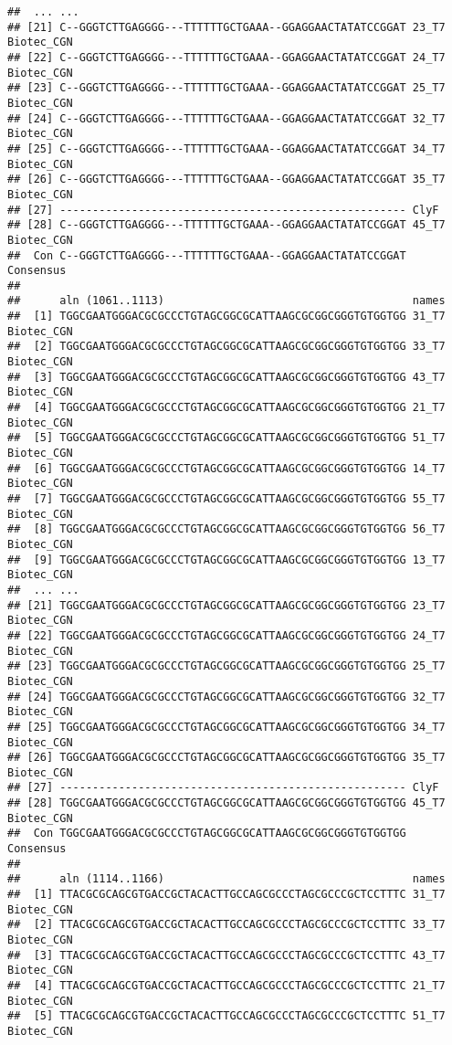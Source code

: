 \documentclass[
]{article}
\begin{document}
\begin{verbatim}
##  ... ...
## [21] C--GGGTCTTGAGGGG---TTTTTTGCTGAAA--GGAGGAACTATATCCGGAT 23_T7 Biotec_CGN
## [22] C--GGGTCTTGAGGGG---TTTTTTGCTGAAA--GGAGGAACTATATCCGGAT 24_T7 Biotec_CGN
## [23] C--GGGTCTTGAGGGG---TTTTTTGCTGAAA--GGAGGAACTATATCCGGAT 25_T7 Biotec_CGN
## [24] C--GGGTCTTGAGGGG---TTTTTTGCTGAAA--GGAGGAACTATATCCGGAT 32_T7 Biotec_CGN
## [25] C--GGGTCTTGAGGGG---TTTTTTGCTGAAA--GGAGGAACTATATCCGGAT 34_T7 Biotec_CGN
## [26] C--GGGTCTTGAGGGG---TTTTTTGCTGAAA--GGAGGAACTATATCCGGAT 35_T7 Biotec_CGN
## [27] ----------------------------------------------------- ClyF
## [28] C--GGGTCTTGAGGGG---TTTTTTGCTGAAA--GGAGGAACTATATCCGGAT 45_T7 Biotec_CGN
##  Con C--GGGTCTTGAGGGG---TTTTTTGCTGAAA--GGAGGAACTATATCCGGAT Consensus 
## 
##      aln (1061..1113)                                      names
##  [1] TGGCGAATGGGACGCGCCCTGTAGCGGCGCATTAAGCGCGGCGGGTGTGGTGG 31_T7 Biotec_CGN
##  [2] TGGCGAATGGGACGCGCCCTGTAGCGGCGCATTAAGCGCGGCGGGTGTGGTGG 33_T7 Biotec_CGN
##  [3] TGGCGAATGGGACGCGCCCTGTAGCGGCGCATTAAGCGCGGCGGGTGTGGTGG 43_T7 Biotec_CGN
##  [4] TGGCGAATGGGACGCGCCCTGTAGCGGCGCATTAAGCGCGGCGGGTGTGGTGG 21_T7 Biotec_CGN
##  [5] TGGCGAATGGGACGCGCCCTGTAGCGGCGCATTAAGCGCGGCGGGTGTGGTGG 51_T7 Biotec_CGN
##  [6] TGGCGAATGGGACGCGCCCTGTAGCGGCGCATTAAGCGCGGCGGGTGTGGTGG 14_T7 Biotec_CGN
##  [7] TGGCGAATGGGACGCGCCCTGTAGCGGCGCATTAAGCGCGGCGGGTGTGGTGG 55_T7 Biotec_CGN
##  [8] TGGCGAATGGGACGCGCCCTGTAGCGGCGCATTAAGCGCGGCGGGTGTGGTGG 56_T7 Biotec_CGN
##  [9] TGGCGAATGGGACGCGCCCTGTAGCGGCGCATTAAGCGCGGCGGGTGTGGTGG 13_T7 Biotec_CGN 
##  ... ...
## [21] TGGCGAATGGGACGCGCCCTGTAGCGGCGCATTAAGCGCGGCGGGTGTGGTGG 23_T7 Biotec_CGN
## [22] TGGCGAATGGGACGCGCCCTGTAGCGGCGCATTAAGCGCGGCGGGTGTGGTGG 24_T7 Biotec_CGN
## [23] TGGCGAATGGGACGCGCCCTGTAGCGGCGCATTAAGCGCGGCGGGTGTGGTGG 25_T7 Biotec_CGN
## [24] TGGCGAATGGGACGCGCCCTGTAGCGGCGCATTAAGCGCGGCGGGTGTGGTGG 32_T7 Biotec_CGN
## [25] TGGCGAATGGGACGCGCCCTGTAGCGGCGCATTAAGCGCGGCGGGTGTGGTGG 34_T7 Biotec_CGN
## [26] TGGCGAATGGGACGCGCCCTGTAGCGGCGCATTAAGCGCGGCGGGTGTGGTGG 35_T7 Biotec_CGN
## [27] ----------------------------------------------------- ClyF
## [28] TGGCGAATGGGACGCGCCCTGTAGCGGCGCATTAAGCGCGGCGGGTGTGGTGG 45_T7 Biotec_CGN
##  Con TGGCGAATGGGACGCGCCCTGTAGCGGCGCATTAAGCGCGGCGGGTGTGGTGG Consensus 
## 
##      aln (1114..1166)                                      names
##  [1] TTACGCGCAGCGTGACCGCTACACTTGCCAGCGCCCTAGCGCCCGCTCCTTTC 31_T7 Biotec_CGN
##  [2] TTACGCGCAGCGTGACCGCTACACTTGCCAGCGCCCTAGCGCCCGCTCCTTTC 33_T7 Biotec_CGN
##  [3] TTACGCGCAGCGTGACCGCTACACTTGCCAGCGCCCTAGCGCCCGCTCCTTTC 43_T7 Biotec_CGN
##  [4] TTACGCGCAGCGTGACCGCTACACTTGCCAGCGCCCTAGCGCCCGCTCCTTTC 21_T7 Biotec_CGN
##  [5] TTACGCGCAGCGTGACCGCTACACTTGCCAGCGCCCTAGCGCCCGCTCCTTTC 51_T7 Biotec_CGN

\end{verbatim}
\end{document}
